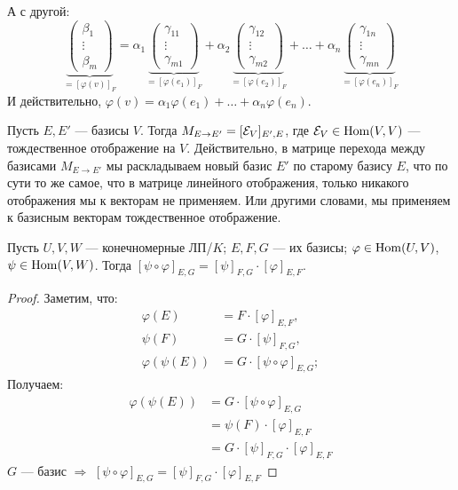 А с другой:
$$
\underbrace{
\begin{pmatrix}
    \beta_1 \\
    \vdots \\ 
    \beta_m
\end{pmatrix}
}_{=[\varphi(v)]_F}
=
\alpha_1
\underbrace{
\begin{pmatrix}
    \gamma_{11} \\ 
    \vdots \\ 
    \gamma_{m1}
\end{pmatrix}
}_{=[\varphi(e_1)]_F}
+
\alpha_2
\underbrace{
\begin{pmatrix}
    \gamma_{12} \\ 
    \vdots \\ 
    \gamma_{m2}
\end{pmatrix}
}_{=[\varphi(e_2)]_F}
+
\dots
+
\alpha_n
\underbrace{
\begin{pmatrix}
    \gamma_{1n} \\ 
    \vdots \\ 
    \gamma_{mn}
\end{pmatrix}
}_{=[\varphi(e_n)]_F}
$$
И действительно, 
$\varphi(v) = \alpha_1 \varphi(e_1) + \dots + \alpha_n \varphi(e_n)$.

\notice Пусть $E, E'$ --- базисы $V$. Тогда $M_{E \to E'} =
[\mathcal{E}_V]_{E', E}$, где $\mathcal{E}_V \in \operatorname{Hom}(V, V)$ --- тождественное отображение на $V$.
Действительно, в матрице перехода между базисами 
$M_{E \to E'}$ мы раскладываем новый базис $E'$ по старому базису $E$,
что по сути то же самое, что в матрице линейного отображения, только
никакого отображения мы к векторам не применяем. Или другими словами,
мы применяем к базисным векторам тождественное отображение.

\begin{theorem}
    Пусть $U, V, W$ --- конечномерные ЛП/$K$; $E, F, G$ --- их базисы;
    $\varphi \in \operatorname{Hom}(U, V)$, $\psi \in \operatorname{Hom}(V, W)$. Тогда
    $[\psi \circ \varphi]_{E,G} = [\psi]_{F,G} \cdot [\varphi]_{E,F}$.
\end{theorem}
\begin{proof}
    Заметим, что:
    \begin{align*}
        \varphi(E) &= F \cdot [\varphi]_{E, F}, \\
        \psi(F) &= G \cdot [\psi]_{F, G}, \\
        \varphi(\psi(E)) &= G \cdot [\psi \circ \varphi]_{E, G};
    \end{align*}
    Получаем:
    \begin{align*}
        \varphi(\psi(E)) &= G \cdot [\psi \circ \varphi]_{E, G} \\
        &= \psi(F) \cdot [\varphi]_{E, F} \\
        &= G \cdot [\psi]_{F, G} \cdot [\varphi]_{E, F}
    \end{align*}
    $G$ --- базис $\Longrightarrow$ 
    $[\psi \circ \varphi]_{E,G} = [\psi]_{F,G} \cdot [\varphi]_{E,F}$
\end{proof}

